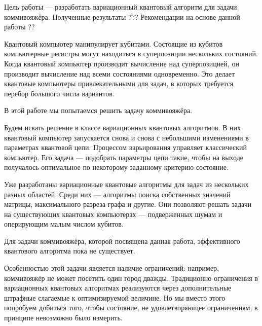 

\usepackage{microtype}
\usepackage[extdef]{delimset}
\usepackage{csquotes} %





\setcounter{page}{2}




Цель работы --- разработать вариационный квантовый алгоритм для задачи коммивояжёра. Полученные результаты ??? Рекомендации на основе данной работы ??




Квантовый компьютер манипулирует кубитами. Состоящие из кубитов компьютерные регистры могут находиться в суперпозиции нескольких состояний. Когда квантовый компьютер производит вычисление над суперпозицией, он производит вычисление над всеми состояниями одновременно. Это делает квантовые компьютеры привлекательными для задач, в которых требуется перебор большого числа вариантов. 

В этой работе мы попытаемся решить задачу коммивояжёра.

Будем искать решение в классе вариационных квантовых алгоритмов. В них квантовый компьютер запускается снова и снова с небольшими изменениями в параметрах квантовой цепи. Процессом варьирования управляет классический компьютер. Его задача --- подобрать параметры цепи такие, чтобы на выходе получалось оптимальное по некоторому заданному критерию состояние.

Уже разработаны вариационные квантовые алгоритмы для задач из нескольких разных областей. Среди них --- алгоритмы поиска собственных значений матрицы, максимального разреза графа и другие. Они позволяют решать задачи на существующих квантовых компьютерах --- подверженных шумам и оперирующим малым числом кубитов.

Для задачи коммивояжёра, которой посвящена данная работа, эффективного квантового алгоритма пока не существует. 

Особенностью этой задачи является наличие ограничений: например, коммивояжёр не может посетить один город дважды. Традиционно ограничения в вариационных квантовых алгоритмах реализуются через дополнительные штрафные слагаемые к оптимизируемой величине. Но мы вместо этого попробуем добиться того, чтобы состояние, не удовлетворяющее ограничениям, в принципе невозможно было измерить.

